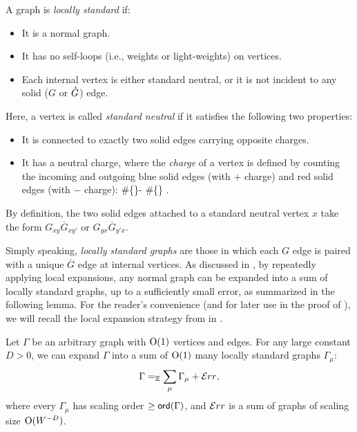  \begin{definition}  \label{deflvl1}
A graph is \emph{locally standard} if: 
\begin{itemize}
\item[(i)] It is a normal graph. %

\item[(ii)] It has no self-loops (i.e., weights or light-weights) on vertices.

\item[(iii)] Each internal vertex is either standard neutral, or it is not incident to any solid ($G$ or ${\mathring G}$) edge.
\end{itemize}
Here, a vertex is called \emph{standard neutral} if it satisfies the following two properties: 
\begin{itemize}
\item It is connected to exactly two solid edges carrying opposite charges. 

\item It has a neutral charge, where the \emph{charge} of a vertex is defined by counting the incoming and outgoing blue solid edges (with $+$ charge) and red solid edges (with $-$ charge): 
\be\label{eq:neutralcharge}
\qquad \#\{\}- \#\{\} .\ee
\end{itemize}
By definition, the two solid edges attached to a standard neutral vertex $x$ take the form $G_{xy}\overline G_{xy'}$ or $G_{yx}\overline G_{y'x}$.
\end{definition}

Simply speaking, \emph{locally standard graphs} are those in which each $G$ edge is paired with a unique $\overline G$ edge at internal vertices. As discussed in \cite[Section 3.4]{yang2021delocalization}, by repeatedly applying local expansions, any normal graph can be expanded into a sum of locally standard graphs, up to a sufficiently small error, as summarized in the following lemma. For the reader's convenience (and for later use in the proof of ), we will recall the local expansion strategy from \cite[Section 3]{yang2021delocalization} in . 



\begin{lemma} \label{lvl1 lemma}
Let $\Gamma$ be an arbitrary graph with $\operatorname{O}(1)$ vertices and edges. For any large constant $D>0$, we can expand $\Gamma$ into a sum of $\operatorname{O}(1)$ many locally standard graphs $\Gamma_\mu$:
\begin{align}\label{expand lvl1}
\Gamma =_{\mathbb{E}} \sum_\mu \Gamma_\mu + {\mathcal Err},
\end{align}
where every $\Gamma_\mu$ has %
scaling order $\ge {\mathsf{ord}}(\Gamma)$, and ${\mathcal Err}$ is a sum of graphs of scaling size $\operatorname{O}(W^{-D})$.
\end{lemma}


